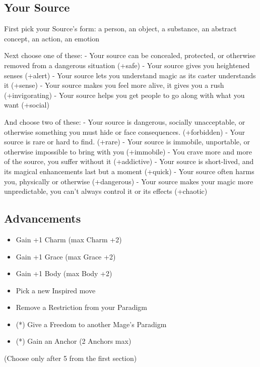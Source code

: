 \documentclass[
]{memoir}
\begin{document}
\hypertarget{your-source}{%
\subsection{Your Source}\label{your-source}}

First pick your Source's form: a person, an object, a substance, an
abstract concept, an action, an emotion

Next choose one of these: - Your source can be concealed, protected, or
otherwise removed from a dangerous situation (+safe) - Your source gives
you heightened senses (+alert) - Your source lets you understand magic
as its caster understands it (+sense) - Your source makes you feel more
alive, it gives you a rush (+invigorating) - Your source helps you get
people to go along with what you want (+social)

And choose two of these: - Your source is dangerous, socially
unacceptable, or otherwise something you must hide or face consequences.
(+forbidden) - Your source is rare or hard to find. (+rare) - Your
source is immobile, unportable, or otherwise impossible to bring with
you (+immobile) - You crave more and more of the source, you suffer
without it (+addictive) - Your source is short-lived, and its magical
enhancements last but a moment (+quick) - Your source often harms you,
physically or otherwise (+dangerous) - Your source makes your magic more
unpredictable, you can't always control it or its effects (+chaotic)

\hypertarget{advancements-3}{%
\subsection{Advancements}\label{advancements-3}}

\begin{itemize}
\tightlist
\item
  Gain +1 Charm (max Charm +2)
\item
  Gain +1 Grace (max Grace +2)
\item
  Gain +1 Body (max Body +2)
\item
  Pick a new Inspired move
\item
  Remove a Restriction from your Paradigm
\item
  (*) Give a Freedom to another Mage's Paradigm
\item
  (*) Gain an Anchor (2 Anchors max)
\end{itemize}

(Choose only after 5 from the first section)
\end{document}
